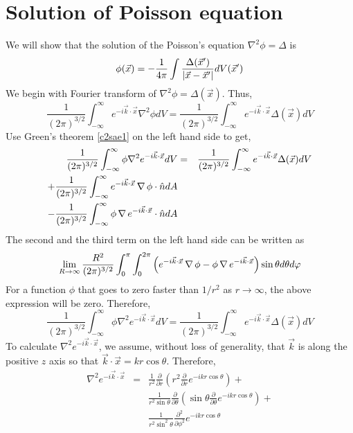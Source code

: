 \section{Solution of Poisson equation}\label{c2sa2} 
We will show that the solution of the Poisson's equation $\nabla^2\phi = \Delta$ is
\[
\phi(\vec{x}) = -\frac{1}{4\pi}\int\frac{\Delta(\vec{x}^\prime)}{|\vec{x} - \vec{x}^\prime|} dV(\vec{x}^\prime)
\]
We begin with Fourier transform of $\nabla^2\phi = \Delta(\vec{x})$. Thus,
\[
\frac{1}{(2\pi)^{3/2}}\int_{-\infty}^{\infty} e^{-i\vec{k}\cdot\vec{x}}\nabla^2\phi dV = \frac{1}{(2\pi)^{3/2}}\int_{-\infty}^{\infty} e^{-i\vec{k}\cdot\vec{x}}\Delta(\vec{x}) dV
\]
Use Green's theorem \eqref{c2sae1} on the left hand side to get,
\begin{eqnarray*}
\frac{1}{(2\pi)^{3/2}}\int_{-\infty}^{\infty} \phi\nabla^2e^{-i\vec{k}\cdot\vec{x}} dV &=& \frac{1}{(2\pi)^{3/2}}\int_{-\infty}^{\infty} e^{-i\vec{k}\cdot\vec{x}}\Delta(\vec{x}) dV \\
+ \frac{1}{(2\pi)^{3/2}}\int_{-\infty}^{\infty} e^{-i\vec{k}\cdot\vec{x}} \operatorname{\nabla}{\phi}\cdot\hat{n} dA & & \\
- \frac{1}{(2\pi)^{3/2}}\int_{-\infty}^{\infty} \phi \operatorname{\nabla}{e^{-i\vec{k}\cdot\vec{x}}}\cdot\hat{n} dA
\end{eqnarray*}
The second and the third term on the left hand side can be written as
\[
\lim_{R \rightarrow \infty} \frac{R^2}{(2\pi)^{3/2}}\int_0^\pi\int_0^{2\pi}\left(e^{-i\vec{k}\cdot\vec{x}} \operatorname{\nabla}{\phi} - \phi \operatorname{\nabla}{e^{-i\vec{k}\cdot\vec{x}}}\right)\sin\theta 
d\theta d\varphi
\]
For a function $\phi$ that goes to zero faster than $1/r^2$ as $r \rightarrow \infty$, the above expression will be zero. Therefore,
\begin{equation}\label{c2sae2}
\frac{1}{(2\pi)^{3/2}}\int_{-\infty}^{\infty} \phi\nabla^2e^{-i\vec{k}\cdot\vec{x}} dV = \frac{1}{(2\pi)^{3/2}}\int_{-\infty}^{\infty} e^{-i\vec{k}\cdot\vec{x}}\Delta(\vec{x}) dV 
\end{equation}
To calculate $\nabla^2e^{-i\vec{k}\cdot\vec{x}}$, we assume, without loss of generality, that $\vec{k}$ is along the positive $z$ axis so that $\vec{k}\cdot\vec{x} = kr\cos\theta$.
Therefore,
\begin{eqnarray*}
\nabla^2e^{-i\vec{k}\cdot\vec{x}} &=& \frac{1}{r^2}\frac{\partial}{\partial r}\left(r^2\frac{\partial}{\partial r} e^{-ikr\cos\theta}\right) + \\
 & & \frac{1}{r^2\sin\theta}\frac{\partial}{\partial\theta}\left(\sin\theta\frac{\partial}{\partial\theta} e^{-ikr\cos\theta}\right) + \\
 & & \frac{1}{r^2\sin^2\theta}\frac{\partial^2}{\partial\phi^2}e^{-ikr\cos\theta}
\end{eqnarray*}
